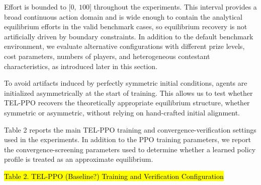 \documentclass[
]{article}
\begin{document}
Effort is bounded to \(\lbrack 0,\ 100\rbrack\) throughout the
experiments. This interval provides a broad continuous action domain and
is wide enough to contain the analytical equilibrium efforts in the
valid benchmark cases, so equilibrium recovery is not artificially
driven by boundary constraints. In addition to the default benchmark
environment, we evaluate alternative configurations with different prize
levels, cost parameters, numbers of players, and heterogeneous
contestant characteristics, as introduced later in this section.

To avoid artifacts induced by perfectly symmetric initial conditions,
agents are initialized asymmetrically at the start of training. This
allows us to test whether TEL-PPO recovers the theoretically appropriate
equilibrium structure, whether symmetric or asymmetric, without relying
on hand-crafted initial alignment.

Table 2 reports the main TEL-PPO training and convergence-verification
settings used in the experiments. In addition to the PPO training
parameters, we report the convergence-screening parameters used to
determine whether a learned policy profile is treated as an approximate
equilibrium.

\hl{Table 2. TEL-PPO (Baseline?) Training and Verification
Configuration}
\end{document}
